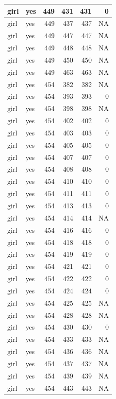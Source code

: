 \documentclass[man]{apa6}
\begin{document}
\begin{tabular}{l|l|r|r|r|r}
\hline
girl & yes & 449 & 431 & 431 & 0\\
\hline
girl & yes & 449 & 437 & 437 & NA\\
\hline
girl & yes & 449 & 447 & 447 & NA\\
\hline
girl & yes & 449 & 448 & 448 & NA\\
\hline
girl & yes & 449 & 450 & 450 & NA\\
\hline
girl & yes & 449 & 463 & 463 & NA\\
\hline
girl & yes & 454 & 382 & 382 & NA\\
\hline
girl & yes & 454 & 393 & 393 & 0\\
\hline
girl & yes & 454 & 398 & 398 & NA\\
\hline
girl & yes & 454 & 402 & 402 & 0\\
\hline
girl & yes & 454 & 403 & 403 & 0\\
\hline
girl & yes & 454 & 405 & 405 & 0\\
\hline
girl & yes & 454 & 407 & 407 & 0\\
\hline
girl & yes & 454 & 408 & 408 & 0\\
\hline
girl & yes & 454 & 410 & 410 & 0\\
\hline
girl & yes & 454 & 411 & 411 & 0\\
\hline
girl & yes & 454 & 413 & 413 & 0\\
\hline
girl & yes & 454 & 414 & 414 & NA\\
\hline
girl & yes & 454 & 416 & 416 & 0\\
\hline
girl & yes & 454 & 418 & 418 & 0\\
\hline
girl & yes & 454 & 419 & 419 & 0\\
\hline
girl & yes & 454 & 421 & 421 & 0\\
\hline
girl & yes & 454 & 422 & 422 & 0\\
\hline
girl & yes & 454 & 424 & 424 & 0\\
\hline
girl & yes & 454 & 425 & 425 & NA\\
\hline
girl & yes & 454 & 428 & 428 & NA\\
\hline
girl & yes & 454 & 430 & 430 & 0\\
\hline
girl & yes & 454 & 433 & 433 & NA\\
\hline
girl & yes & 454 & 436 & 436 & NA\\
\hline
girl & yes & 454 & 437 & 437 & NA\\
\hline
girl & yes & 454 & 439 & 439 & NA\\
\hline
girl & yes & 454 & 443 & 443 & NA\\

\end{tabular}
\end{document}
